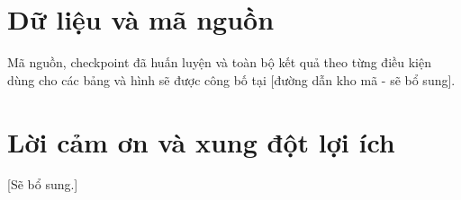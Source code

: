 \documentclass[a4paper,11pt]{article}
\begin{document}
\section*{Dữ liệu và mã nguồn}
Mã nguồn, checkpoint đã huấn luyện và toàn bộ kết quả theo từng điều kiện
dùng cho các bảng và hình sẽ được công bố tại [đường dẫn kho mã - sẽ bổ
sung].

\section*{Lời cảm ơn và xung đột lợi ích}
[Sẽ bổ sung.]



\end{document}

